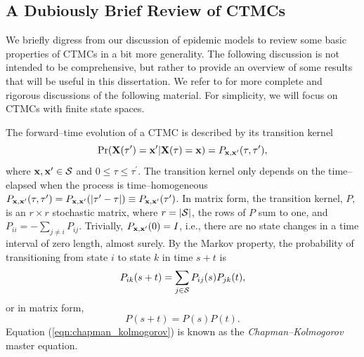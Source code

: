 \subsection{A Dubiously Brief Review of CTMCs}
\label{subsec:ctmc_overview}

We briefly digress from our discussion of epidemic models to review some basic properties of CTMCs in a bit more generality. The following discussion is not intended to be comprehensive, but rather to provide an overview of some results that will be useful in this dissertation. We refer to \cite{bremaud1999markov,fuchs2013inference,guttorp1995stochastic,wilkinson2011stochastic} for more complete and rigorous discussions of the following material. For simplicity, we will focus on CTMCs with finite state spaces. 

The forward--time evolution of a CTMC is described by its transition kernel $$\Pr(\mathbf{X}(\tau^\prime) = \mathbf{x}^\prime | \mathbf{X}(\tau) = \mathbf{x}) = P_{\mathbf{x},\mathbf{x}^\prime}(\tau,\tau^\prime),$$
where $ \mathbf{x},\mathbf{x}^\prime\in\mathcal{S} $ and $ 0\leq\tau\leq\tau^\prime $. The transition kernel only depends on the time--elapsed when the process is time--homogeneous $ P_{\mathbf{x},\mathbf{x}^\prime}(\tau,\tau^\prime) = P_{\mathbf{x},\mathbf{x}^\prime}(|\tau^\prime - \tau|) \equiv P_{\mathbf{x},\mathbf{x}^\prime}(\tau^\prime) $. In matrix form, the transition kernel, $ P $, is an $ r\times r $ stochastic matrix, where $ r = |\mathcal{S}| $, the rows of $ P $ sum to one, and $ P_{ii} = -\sum_{j\neq i}P_{ij}$. Trivially, $ P_{\mathbf{x},\mathbf{x}^\prime}(0) = I $, i.e., there are no state changes in a time interval of zero length, almost surely. By the Markov property, the probability of transitioning from state $ i $ to state $ k $ in time $ s+t $ is 
\begin{equation}
\label{eqn:chapman_kolmogorov}
P_{ik}(s+t) = \sum_{j\in\mathcal{S}}P_{ij}(s)P_{jk}(t),
\end{equation}
or in matrix form, $$P(s+t) = P(s)P(t).$$
Equation (\ref{eqn:chapman_kolmogorov}) is known as the \textit{Chapman--Kolmogorov} master equation. 

